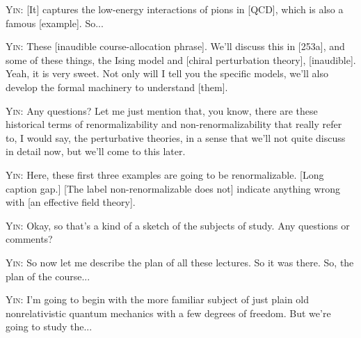 \noindent\textsc{Yin:} [It] captures the low-energy interactions of pions in [QCD], which is also a famous [example]. So...\par

\noindent\textsc{Yin:} These [inaudible course-allocation phrase]. We'll discuss this in [253a], and some of these things, the Ising model and [chiral perturbation theory], [inaudible]. Yeah, it is very sweet. Not only will I tell you the specific models, we'll also develop the formal machinery to understand [them].\par

\noindent\textsc{Yin:} Any questions? Let me just mention that, you know, there are these historical terms of renormalizability and non-renormalizability that really refer to, I would say, the perturbative theories, in a sense that we'll not quite discuss in detail now, but we'll come to this later.\par

\noindent\textsc{Yin:} Here, these first three examples are going to be renormalizable. [Long caption gap.] [The label non-renormalizable does not] indicate anything wrong with [an effective field theory].\par


\noindent\textsc{Yin:} Okay, so that's a kind of a sketch of the subjects of study. Any questions or comments?\par

\noindent\textsc{Yin:} So now let me describe the plan of all these lectures. So it was there. So, the plan of the course...\par

\noindent\textsc{Yin:} I'm going to begin with the more familiar subject of just plain old nonrelativistic quantum mechanics with a few degrees of freedom. But we're going to study the...\par

